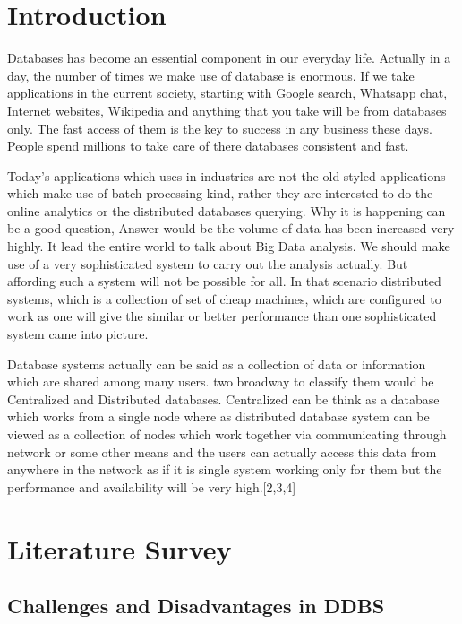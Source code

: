 \documentclass{article}[12pt,a4paper]
\begin{document}
\tableofcontents
\thispagestyle{empty}
\newpage
{}

\section{Introduction}

Databases has become an essential component in our everyday life. Actually in a day, the number of times we make use of database is enormous. If we take applications in the current society, starting with Google search, Whatsapp chat, Internet websites, Wikipedia and anything that you take will be from databases only. The fast access of them is the key to success in any business these days. People spend millions to take care of there databases consistent and fast.

Today’s applications which uses in industries are not the old-styled applications which make use of batch processing kind, rather they are interested to do the online analytics or the distributed databases querying. Why it is happening can be a good question, Answer would be the volume of data has been increased very highly. It lead the entire world to talk about Big Data analysis. We should make use of a very sophisticated system to carry out the analysis actually. But affording such a system will not be possible for all. In that scenario distributed systems, which is a collection of set of cheap machines, which are configured to work as one will give the similar or better performance than one sophisticated system came into picture.

Database systems actually can be said as a collection of data or information which are shared among many users. two broadway to classify them would be Centralized and Distributed databases. Centralized can be think as a database which works from a single node where as distributed database system can be viewed as a collection of nodes which work together via communicating through network or some other means and the users can actually access this data from anywhere in the network as if it is single system working only for them but the performance and availability will be very high.[2,3,4]


\section {Literature Survey}
\subsection{Challenges and Disadvantages in DDBS}
\end{document}
